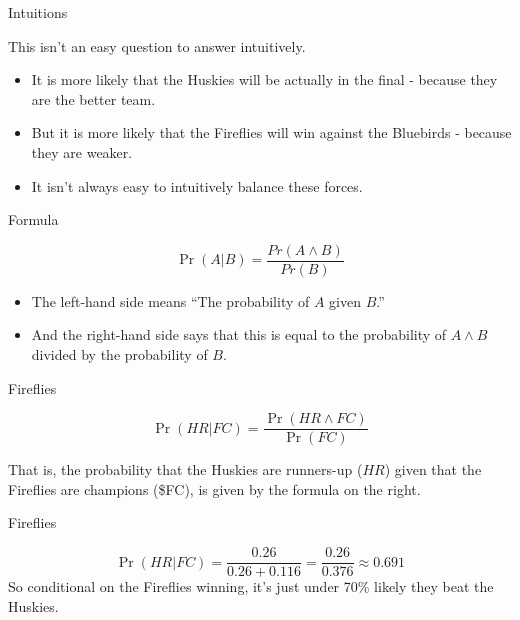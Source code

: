\documentclass[
  ignorenonframetext,
]{beamer}
\providecommand{\tightlist}{%
  \setlength{\itemsep}{0pt}\setlength{\parskip}{0pt}}
\renewcommand{\,}{\text{, }}
\begin{document}
\begin{frame}{Intuitions}
\protect\hypertarget{intuitions}{}

This isn't an easy question to answer intuitively.

\begin{itemize}
\tightlist
\item
  It is more likely that the Huskies will be actually in the final -
  because they are the better team.
\item
  But it is more likely that the Fireflies will win against the
  Bluebirds - because they are weaker.
\item
  It isn't always easy to intuitively balance these forces.
\end{itemize}

\end{frame}

\begin{frame}{Formula}
\protect\hypertarget{formula}{}

\[
\Pr(A | B) = \frac{Pr(A \wedge B)}{Pr(B)}
\]

\pause

\begin{itemize}
\tightlist
\item
  The left-hand side means ``The probability of \(A\) given \(B\).''
  \pause
\item
  And the right-hand side says that this is equal to the probability of
  \(A \wedge B\) divided by the probability of \(B\).
\end{itemize}

\end{frame}

\begin{frame}{Fireflies}
\protect\hypertarget{fireflies}{}

\[
\Pr(HR | FC) = \frac{\Pr(HR \wedge FC)}{\Pr(FC)}
\]

That is, the probability that the Huskies are runners-up (\(HR\)) given
that the Fireflies are champions (\$FC), is given by the formula on the
right.

\end{frame}

\begin{frame}{Fireflies}
\protect\hypertarget{fireflies-1}{}

\[
\Pr(HR | FC) = \frac{0.26}{0.26+0.116} = \frac{0.26}{0.376} \approx 0.691
\] So conditional on the Fireflies winning, it's just under 70\% likely
they beat the Huskies.

\end{frame}
\end{document}
